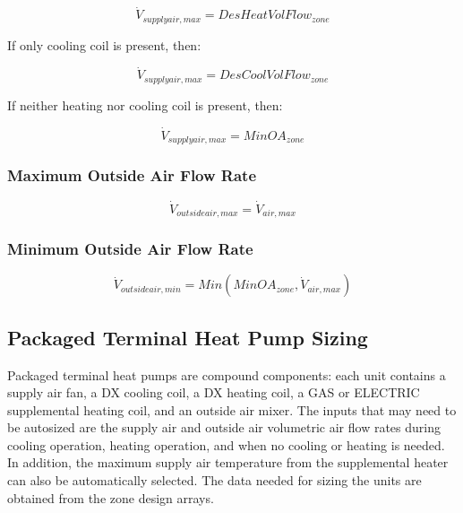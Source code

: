 \begin{equation}
{\dot V_{supplyair,max}} = DesHeatVolFlo{w_{zone}}
\end{equation}

If only cooling coil is present, then:

\begin{equation}
{\dot V_{supplyair,max}} = DesCoolVolFlo{w_{zone}}
\end{equation}

If neither heating nor cooling coil is present, then:

\begin{equation}
{\dot V_{supplyair,max}} = MinO{A_{zone}}
\end{equation}

\subsubsection{Maximum Outside Air Flow Rate}\label{maximum-outside-air-flow-rate-2}

\begin{equation}
{\dot V_{outsideair,max}} = {\dot V_{air,max}}
\end{equation}

\subsubsection{Minimum Outside Air Flow Rate}\label{minimum-outside-air-flow-rate}

\begin{equation}
{\dot V_{outsideair,min}} = Min\left( {MinO{A_{zone}},{{\dot V}_{air,max}}} \right)
\end{equation}

\subsection{Packaged Terminal Heat Pump Sizing}\label{packaged-terminal-heat-pump-sizing}

Packaged terminal heat pumps are compound components: each unit contains a supply air fan, a DX cooling coil, a DX heating coil, a GAS or ELECTRIC supplemental heating coil, and an outside air mixer. The inputs that may need to be autosized are the supply air and outside air volumetric air flow rates during cooling operation, heating operation, and when no cooling or heating is needed. In addition, the maximum supply air temperature from the supplemental heater can also be automatically selected. The data needed for sizing the units are obtained from the zone design arrays.

